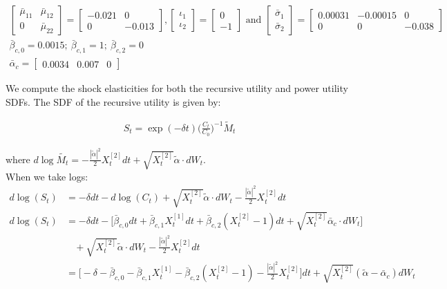 \documentclass[12pt]{article}
\begin{document}
\begin{gather*}
\begin{bmatrix} \bar{\mu}_{11} & \bar{\mu}_{12} \\ 0 & \bar{\mu}_{22} \end{bmatrix} =
\begin{bmatrix} -0.021  & 0 \\ 0 & -0.013  \end{bmatrix},
\begin{bmatrix}
 \iota_1 \\  \iota_2 \end{bmatrix}  = \begin{bmatrix}
0 \\  -1 \end{bmatrix} \text{ and } \begin{bmatrix} \bar{\sigma}_1 \\  \bar{\sigma}_2 \end{bmatrix}  = \begin{bmatrix} 0.00031 & -0.00015 & 0 \\ 0 & 0 & -0.038 \end{bmatrix} \\
\bar{\beta}_{c,0} = 0.0015; \ \bar{\beta}_{c,1} = 1; \ \bar{\beta}_{c,2} = 0 \\
\bar{\alpha}_{c} = \begin{bmatrix} 0.0034 & 0.007 & 0 \end{bmatrix}
\end{gather*}

We compute the shock elasticities for both the recursive utility and power utility SDFs. The SDF of the recursive utility is given by:

\begin{align*}
S_t = \exp{(-\delta t)} \bigg( \frac{C_t}{C_0} \bigg)^{-1} \tilde{M}_t
\end{align*}

where $d\log{\widetilde{M_t}} =  - \frac{|\tilde{\alpha}|^2}{2} X^{[2]}_tdt + \sqrt{X^{[2]}_t} \tilde{\alpha} \cdot dW_t$. \\

When we take logs:
\begin{align*}
 d\log(S_t) &= -\delta dt - d\log(C_t) + \sqrt{X^{[2]}_t}\tilde{\alpha}\cdot dW_t - \frac{|\tilde{\alpha}|^2}{2}X^{[2]}_tdt \\
d\log(S_t) &= -\delta dt - \bigg[ \bar{\beta}_{c,0}dt + \bar{\beta}_{c,1} X^{[1]}_t dt + \bar{\beta}_{c,2} (X^{[2]}_t - 1)dt + \sqrt{X^{[2]}_t} \bar{\alpha}_c \cdot dW_t  \bigg] \\
&\ \ \ \ + \sqrt{X^{[2]}_t}\tilde{\alpha}\cdot dW_t - \frac{|\tilde{\alpha}|^2}{2}X^{[2]}_tdt \\
&= \bigg[ -\delta - \bar{\beta}_{c,0} - \bar{\beta}_{c,1} X^{[1]}_t - \bar{\beta}_{c,2} (X^{[2]}_t - 1) -  \frac{|\tilde{\alpha}|^2}{2}X^{[2]}_t \bigg] dt + \sqrt{X^{[2]}_t} (\tilde{\alpha} - \bar{\alpha}_c) dW_t
\end{align*}
\end{document}

